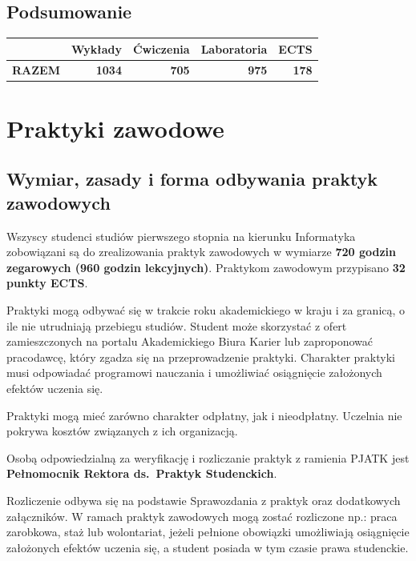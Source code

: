 \documentclass[12pt,a4paper]{article}
\begin{document}
\subsection*{Podsumowanie}

\begin{tabular}{lrrrr}
\toprule
\rowcolor{pjatkRed} {\color{white}} & {\color{white}\textbf{Wykłady}} & {\color{white}\textbf{Ćwiczenia}} & {\color{white}\textbf{Laboratoria}} & {\color{white}\textbf{ECTS}} \\
\midrule
\textbf{RAZEM} & \textbf{1034} & \textbf{705} & \textbf{975} & \textbf{178} \\
\bottomrule
\end{tabular}



\newpage

\section{Praktyki zawodowe}

\subsection*{Wymiar, zasady i forma odbywania praktyk zawodowych}

Wszyscy studenci studiów pierwszego stopnia na kierunku Informatyka zobowiązani są do zrealizowania praktyk zawodowych w wymiarze \textbf{720 godzin zegarowych (960 godzin lekcyjnych)}. Praktykom zawodowym przypisano \textbf{32 punkty ECTS}.

Praktyki mogą odbywać się w trakcie roku akademickiego w kraju i za granicą, o ile nie utrudniają przebiegu studiów. Student może skorzystać z ofert zamieszczonych na portalu Akademickiego Biura Karier lub zaproponować pracodawcę, który zgadza się na przeprowadzenie praktyki. Charakter praktyki musi odpowiadać programowi nauczania i umożliwiać osiągnięcie założonych efektów uczenia się.

Praktyki mogą mieć zarówno charakter odpłatny, jak i nieodpłatny. Uczelnia nie pokrywa kosztów związanych z ich organizacją.

Osobą odpowiedzialną za weryfikację i rozliczanie praktyk z ramienia PJATK jest \textbf{Pełnomocnik Rektora ds.~Praktyk Studenckich}.

Rozliczenie odbywa się na podstawie Sprawozdania z praktyk oraz dodatkowych załączników. W ramach praktyk zawodowych mogą zostać rozliczone np.: praca zarobkowa, staż lub wolontariat, jeżeli pełnione obowiązki umożliwiają osiągnięcie założonych efektów uczenia się, a student posiada w tym czasie prawa studenckie.
\end{document}
